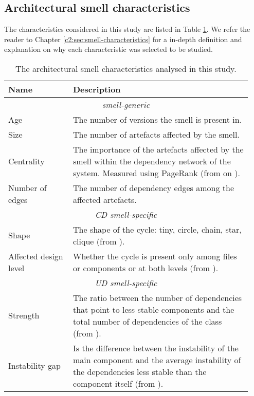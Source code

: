 \subsection{Architectural smell characteristics}\label{c4:sec:smell-characteristics}
The characteristics considered in this study are listed in Table \ref{c4:tab:characteristics}.
We refer the reader to Chapter \ref{c2:sec:smell-characteristics} for a in-depth definition and explanation on why each characteristic was selected to be studied.

\begin{table}[tbp]
   \footnotesize
    \centering
    \caption{The architectural smell characteristics analysed in this study.}\label{c4:tab:characteristics}
    \begin{tabular}{p{0.25\linewidth}|p{0.69\linewidth}}\toprule
        \textbf{Name} & \textbf{Description} \\ \midrule
        \multicolumn{2}{c}{\itshape smell-generic} \\ \midrule
        Age & The number of versions the smell is present in. \\
        Size & The number of artefacts affected by the smell. \\
        Centrality & The importance of the artefacts affected by the smell within the dependency network of the system.  Measured using PageRank (from on \cite{Roveda2018}). \\
        Number of edges & The number of dependency edges among the affected artefacts. \\ \midrule
        \multicolumn{2}{c}{\itshape CD smell-specific}\\\midrule
        Shape & The shape of the cycle: tiny, circle, chain, star, clique (from \cite{AlMutawa2014}). \\
        Affected design level & Whether the cycle is present only among files or components or at both levels (from \cite{AlMutawa2014}). \\ \midrule
        \multicolumn{2}{c}{\itshape UD smell-specific}\\\midrule
        Strength & The ratio between the number of dependencies that point to less stable components and the total number of dependencies of the class (from \cite{Arcelli2016}). \\
        Instability gap & Is the difference between the instability of the main component and the average instability of the dependencies less stable than the component itself  (from \cite{Arcelli2016}). \\\midrule

\end{tabular}
\end{table}
